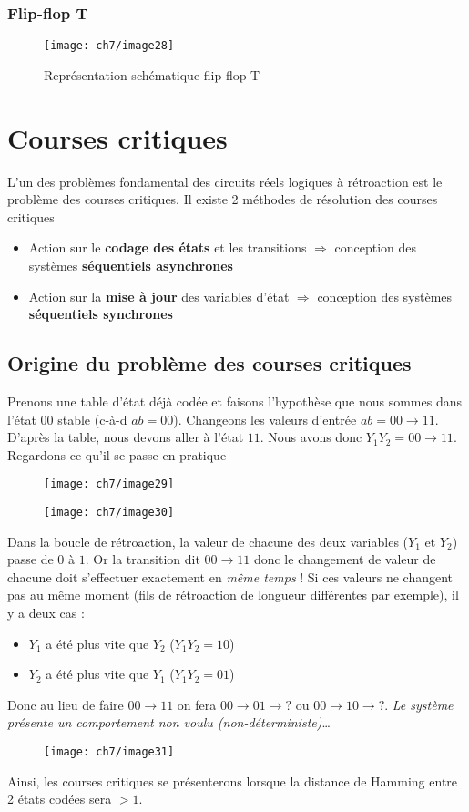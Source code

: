 \subsubsection{Flip-flop T}
\begin{figure}[H]
	\centering
	\texttt{[image: ch7/image28]}
	\caption{Représentation schématique flip-flop T}
\end{figure}
\section{Courses critiques}
L'un des problèmes fondamental des circuits réels logiques à rétroaction est le problème des courses critiques. Il existe 2 méthodes de résolution des courses critiques 
\begin{itemize}
	\item Action sur le \textbf{codage des états} et les transitions $\Rightarrow$ conception des systèmes \textbf{séquentiels asynchrones}
	\item Action sur la \textbf{mise à jour} des variables d'état $\Rightarrow$ conception des systèmes \textbf{séquentiels synchrones}
\end{itemize}
\subsection{Origine du problème des courses critiques}
Prenons une table d'état déjà codée et faisons l'hypothèse que nous sommes dans l'état $00$ stable (c-à-d $ab=00$). Changeons les valeurs d'entrée $ab=00\rightarrow 11$. D'après la table, nous devons aller à l'état $11$. Nous avons donc $Y_1Y_2=00\rightarrow 11$. Regardons ce qu'il se passe en pratique
\begin{figure}[H]
	\centering
	\texttt{[image: ch7/image29]}
\end{figure}
\begin{figure}[H]
	\centering
	\texttt{[image: ch7/image30]}
\end{figure}
Dans la boucle de rétroaction, la valeur de chacune des deux variables ($Y_1$ et $Y_2$) passe de $0$ à $1$. Or la transition dit $00\rightarrow 11$ donc le changement de valeur de chacune doit s'effectuer exactement en \emph{même temps} ! Si ces valeurs ne changent pas au même moment (fils de rétroaction de longueur différentes par exemple), il y a deux cas :
\begin{itemize}
	\item $Y_1$ a été plus vite que $Y_2$ ($Y_1Y_2=10$)
	\item $Y_2$ a été plus vite que $Y_1$ ($Y_1Y_2=01$)
\end{itemize} 
Donc au lieu de faire $00\rightarrow 11$ on fera $00\rightarrow 01\rightarrow ?$ ou  $00\rightarrow 10\rightarrow ?$. \emph{Le système présente un comportement non voulu (non-déterministe)}\dots
\begin{figure}[H]
	\centering
	\texttt{[image: ch7/image31]}
\end{figure}
Ainsi, les courses critiques se présenterons lorsque la distance de Hamming entre 2 états codées sera $>1$.
